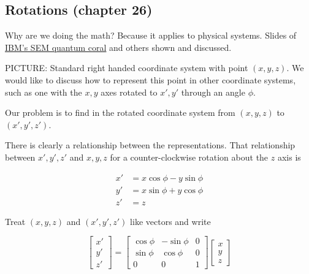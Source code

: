 %
%

\subsection{Rotations (chapter 26)}

Why are we doing the math?  Because it applies to physical systems.  Slides of \href{http://www.almaden.ibm.com/vis/stm/images/stm.gif}{IBM's SEM quantum coral} and others shown and discussed.

PICTURE: Standard right handed coordinate system with point $(x,y,z)$. We would like to discuss how to represent this point in other coordinate systems, such as one with the $x,y$ axes rotated to $x',y'$ through an angle $\phi$.

Our problem is to find in the rotated coordinate system from $(x,y,z)$ to $(x', y', z')$.

There is clearly a relationship between the representations.  That relationship between $x', y', z'$ and $x,y,z$ for a counter-clockwise rotation about the $z$ axis is

\begin{align}\label{eqn:PHY356FDec7:10}
x' &= x \cos \phi - y \sin\phi \\
y' &= x \sin \phi + y \cos\phi \\
z' &= z
\end{align}

Treat $(x,y,z)$ and $(x',y',z')$ like vectors and write

\begin{equation}\label{eqn:PHY356FDec7:20}
\begin{bmatrix}
x'  \\
y' \\
z'
\end{bmatrix}
=
\begin{bmatrix}
\cos \phi &- \sin\phi & 0 \\
\sin \phi & \cos\phi & 0 \\
0 & 0 & 1
\end{bmatrix}
\begin{bmatrix}
x  \\
y \\
z
\end{bmatrix}
\end{equation}

